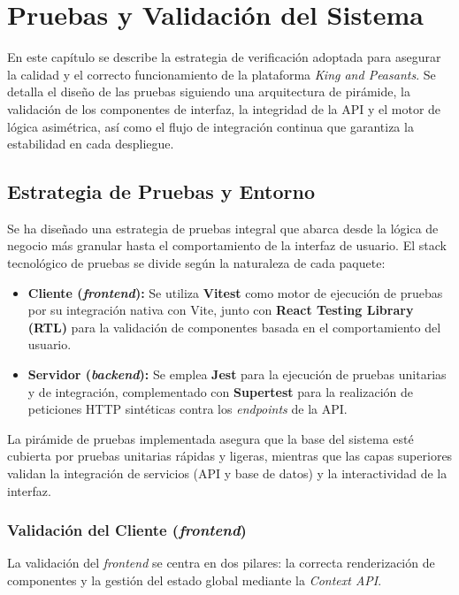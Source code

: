 \chapter{Pruebas y Validación del Sistema}

En este capítulo se describe la estrategia de verificación adoptada para asegurar la calidad y el correcto funcionamiento de la plataforma \textit{King and Peasants}. Se detalla el diseño de las pruebas siguiendo una arquitectura de pirámide, la validación de los componentes de interfaz, la integridad de la API y el motor de lógica asimétrica, así como el flujo de integración continua que garantiza la estabilidad en cada despliegue.

\section{Estrategia de Pruebas y Entorno}

Se ha diseñado una estrategia de pruebas integral que abarca desde la lógica de negocio más granular hasta el comportamiento de la interfaz de usuario. El stack tecnológico de pruebas se divide según la naturaleza de cada paquete:

\begin{itemize}
    \item \textbf{Cliente (\textit{frontend}):} Se utiliza \textbf{Vitest} como motor de ejecución de pruebas por su integración nativa con Vite, junto con \textbf{React Testing Library (RTL)} para la validación de componentes basada en el comportamiento del usuario.
    \item \textbf{Servidor (\textit{backend}):} Se emplea \textbf{Jest} para la ejecución de pruebas unitarias y de integración, complementado con \textbf{Supertest} para la realización de peticiones HTTP sintéticas contra los \textit{endpoints} de la API.
\end{itemize}

La pirámide de pruebas implementada asegura que la base del sistema esté cubierta por pruebas unitarias rápidas y ligeras, mientras que las capas superiores validan la integración de servicios (API y base de datos) y la interactividad de la interfaz.

\subsection{Validación del Cliente (\textit{frontend})}

La validación del \textit{frontend} se centra en dos pilares: la correcta renderización de componentes y la gestión del estado global mediante la \textit{Context API}.


